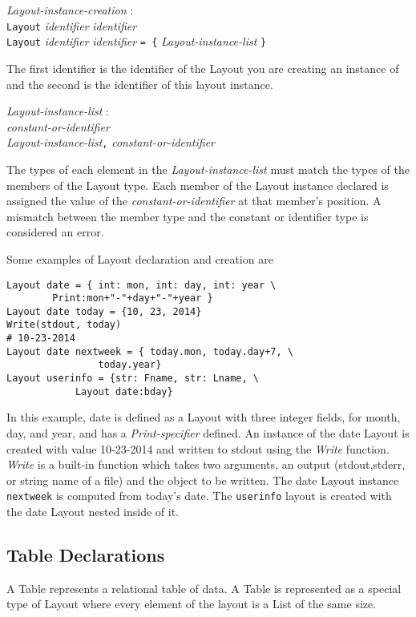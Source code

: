 \documentclass{article}
\begin{document}
\begin{tabbing}
	\= \emph{Layout}\=\emph{-instance-creation} : \\
		\> \> \texttt{Layout} \emph{identifier} \emph{identifier} \\
		\>\> \texttt{Layout} \emph{identifier} \emph{identifier} \texttt{= \{} \emph{Layout-instance-list} \texttt{\}}
\end{tabbing}
The first identifier is the identifier of the Layout you are creating an instance of and the second is the identifier of this layout instance. 
\begin{tabbing}
	\= \emph{Layout}\=\emph{-instance-list} : \\
		\> \> \emph{constant-or-identifier} \\
		\>\> \emph{Layout-instance-list}\texttt{,} \emph{constant-or-identifier}
\end{tabbing}
The types of each element in the \emph{Layout-instance-list} must match the types of the members of the Layout type. Each member of the Layout instance declared is assigned the value of the \emph{constant-or-identifier} at that member's position. A mismatch between the member type and the constant or identifier type is considered an error.

Some examples of Layout declaration and creation are

\begin{lstlisting}
Layout date = { int: mon, int: day, int: year \
		Print:mon+"-"+day+"-"+year }
Layout date today = {10, 23, 2014}
Write(stdout, today)
# 10-23-2014
Layout date nextweek = { today.mon, today.day+7, \
				today.year}
Layout userinfo = {str: Fname, str: Lname, \		
			Layout date:bday}
\end{lstlisting}
In this example, date is defined as a Layout with three integer fields, for month, day, and year, and has a \emph{Print-specifier} defined. An instance of the date Layout is created with value 10-23-2014 and written to stdout using the \emph{Write} function. \emph{Write} is a built-in function which takes two arguments, an output (stdout,stderr, or string name of a file) and the object to be written. The date Layout instance \texttt{nextweek} is computed from today's date. The \texttt{userinfo} layout is created with the date Layout nested inside of it. 

\subsection{Table Declarations}
A Table represents a relational table of data. A Table is represented as a special type of Layout where every element of the layout is a List of the same size.
\end{document}
